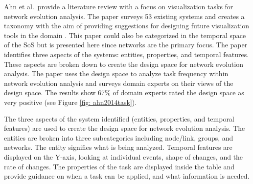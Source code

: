 Ahn et al.\ provide a literature review with a focus on visualization tasks for network evolution analysis. The paper surveys 53 existing systems and creates a taxonomy with the aim of providing suggestions for designing future visualization tools in the domain \cite{ahn2014task}. This paper could also be categorized in the temporal space of the SoS but is presented here since networks are the primary focus.
The paper identifies three aspects of the systems: entities, properties, and temporal features. These aspects are broken down to create the design space for network evolution analysis. The paper uses the design space to analyze task frequency within network evolution analysis and surveys domain experts on their views of the design space. 
The results show 67\% of domain experts rated the design space as very positive (see Figure \ref{fig: ahn2014task}).


The three aspects of the system identified (entities, properties, and temporal features) are used to create the design space for network evolution analysis. The entities are broken into three subcategories including node/link, groups, and networks. The entity signifies what is being analyzed. Temporal features are displayed on the Y-axis, looking at individual events, shape of changes, and the rate of changes. The properties of the task are displayed inside the table and provide guidance on when a task can be applied, and what information is needed.

